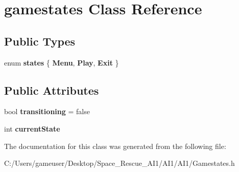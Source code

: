 \hypertarget{classgamestates}{}\section{gamestates Class Reference}
\label{classgamestates}
\subsection*{Public Types}
\begin{DoxyCompactItemize}
\item 
\mbox{\label{classgamestates_ac3bf7972209e57409fd9e5926be122db}} 
enum {\bfseries states} \{ {\bfseries Menu}, 
{\bfseries Play}, 
{\bfseries Exit}
 \}
\end{DoxyCompactItemize}
\subsection*{Public Attributes}
\begin{DoxyCompactItemize}
\item 
\mbox{\label{classgamestates_a2d056491dc2a0c14c07bb6cdd01d38eb}} 
bool {\bfseries transitioning} = false
\item 
\mbox{\label{classgamestates_ab7b617a925822e6611e2467a44346cb2}} 
int {\bfseries current\+State}
\end{DoxyCompactItemize}


The documentation for this class was generated from the following file\+:\begin{DoxyCompactItemize}
\item 
C\+:/\+Users/gameuser/\+Desktop/\+Space\+\_\+\+Rescue\+\_\+\+A\+I1/\+A\+I1/\+A\+I1/Gamestates.\+h\end{DoxyCompactItemize}

